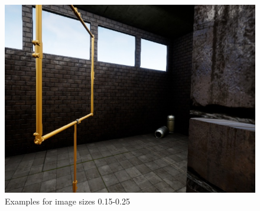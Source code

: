 \documentclass{article}
\begin{document}
\begin{figure}[htbp]
\begin{minipage}{0.3\linewidth}
	\includegraphics[width=\linewidth]{size_examples/015-025 (7).jpg}
\end{minipage}
	\caption{Examples for image sizes 0.15-0.25}
\end{figure}
\end{document}
